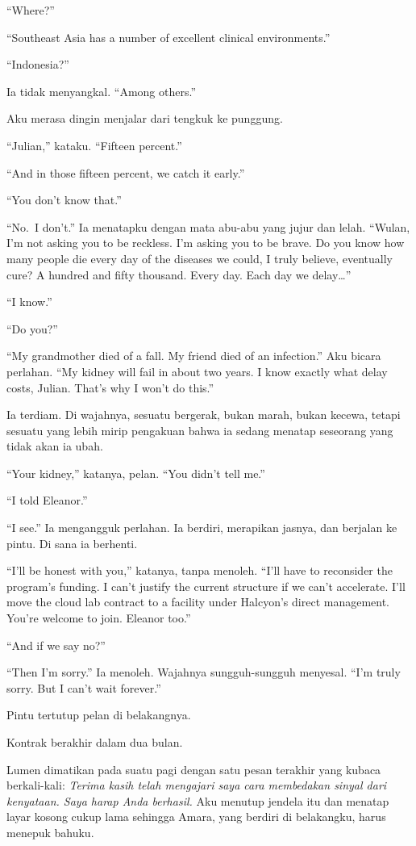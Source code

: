 \documentclass[11pt,twoside,openany]{book}
\makeatletter
\newcommand{\scenebreak}{\par\vspace{0.9em}{\centering\textsc{*\hspace{0.7em}*\hspace{0.7em}*}\par}\vspace{0.9em}\@afterindentfalse\@afterheading}
\makeatother
\begin{document}
``Where?''

``Southeast Asia has a number of excellent clinical environments.''

``Indonesia?''

Ia tidak menyangkal. ``Among others.''

Aku merasa dingin menjalar dari tengkuk ke punggung.

``Julian,'' kataku. ``Fifteen percent.''

``And in those fifteen percent, we catch it early.''

``You don't know that.''

``No.~I don't.'' Ia menatapku dengan mata abu-abu yang jujur dan lelah. ``Wulan, I'm not asking you to be reckless. I'm asking you to be brave. Do you know how many people die every day of the diseases we could, I truly believe, eventually cure? A hundred and fifty thousand. Every day. Each day we delay\ldots{}''

``I know.''

``Do you?''

``My grandmother died of a fall. My friend died of an infection.'' Aku bicara perlahan. ``My kidney will fail in about two years. I know exactly what delay costs, Julian. That's why I won't do this.''

Ia terdiam. Di wajahnya, sesuatu bergerak, bukan marah, bukan kecewa, tetapi sesuatu yang lebih mirip pengakuan bahwa ia sedang menatap seseorang yang tidak akan ia ubah.

``Your kidney,'' katanya, pelan. ``You didn't tell me.''

``I told Eleanor.''

``I see.'' Ia mengangguk perlahan. Ia berdiri, merapikan jasnya, dan berjalan ke pintu. Di sana ia berhenti.

``I'll be honest with you,'' katanya, tanpa menoleh. ``I'll have to reconsider the program's funding. I can't justify the current structure if we can't accelerate. I'll move the cloud lab contract to a facility under Halcyon's direct management. You're welcome to join. Eleanor too.''

``And if we say no?''

``Then I'm sorry.'' Ia menoleh. Wajahnya sungguh-sungguh menyesal. ``I'm truly sorry. But I can't wait forever.''

Pintu tertutup pelan di belakangnya.

\scenebreak
Kontrak berakhir dalam dua bulan.

Lumen dimatikan pada suatu pagi dengan satu pesan terakhir yang kubaca berkali-kali: \emph{Terima kasih telah mengajari saya cara membedakan sinyal dari kenyataan. Saya harap Anda berhasil.} Aku menutup jendela itu dan menatap layar kosong cukup lama sehingga Amara, yang berdiri di belakangku, harus menepuk bahuku.
\end{document}
